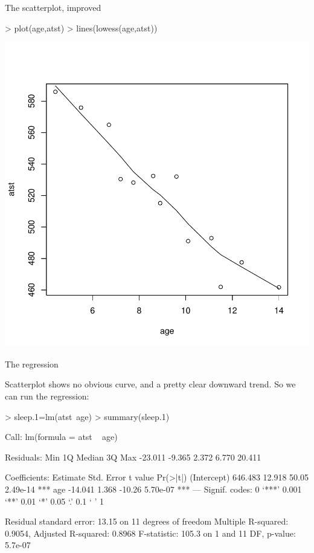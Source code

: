 \documentclass{beamer}
\begin{document}
\begin{frame}[fragile]{The scatterplot, improved}


\begin{Schunk}
\begin{Sinput}
> plot(age,atst)
> lines(lowess(age,atst))
\end{Sinput}
\end{Schunk}
\includegraphics{Regression-003}


\end{frame}


\begin{frame}[fragile]{The regression}

Scatterplot shows no obvious curve, and a pretty clear downward trend. So we can run the regression:

\begin{Schunk}
\begin{Sinput}
> sleep.1=lm(atst~age)
> summary(sleep.1)
\end{Sinput}
\begin{Soutput}
Call:
lm(formula = atst ~ age)

Residuals:
    Min      1Q  Median      3Q     Max 
-23.011  -9.365   2.372   6.770  20.411 

Coefficients:
            Estimate Std. Error t value Pr(>|t|)    
(Intercept)  646.483     12.918   50.05 2.49e-14 ***
age          -14.041      1.368  -10.26 5.70e-07 ***
---
Signif. codes:  0 ‘***’ 0.001 ‘**’ 0.01 ‘*’ 0.05 ‘.’ 0.1 ‘ ’ 1

Residual standard error: 13.15 on 11 degrees of freedom
Multiple R-squared:  0.9054,	Adjusted R-squared:  0.8968 
F-statistic: 105.3 on 1 and 11 DF,  p-value: 5.7e-07
\end{Soutput}
\end{Schunk}

\end{frame}
\end{document}
